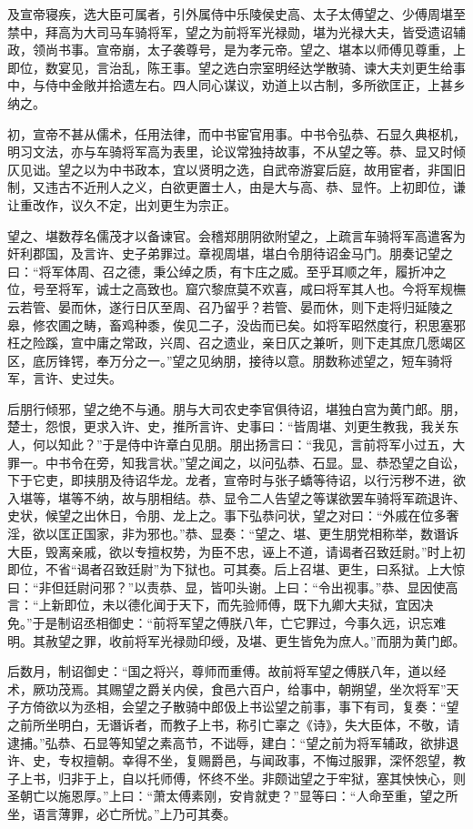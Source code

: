 \documentclass[]{article}
\begin{document}
及宣帝寝疾，选大臣可属者，引外属侍中乐陵侯史高、太子太傅望之、少傅周堪至禁中，拜高为大司马车骑将军，望之为前将军光禄勋，堪为光禄大夫，皆受遗诏辅政，领尚书事。宣帝崩，太子袭尊号，是为孝元帝。望之、堪本以师傅见尊重，上即位，数宴见，言治乱，陈王事。望之选白宗室明经达学散骑、谏大夫刘更生给事中，与侍中金敞并拾遗左右。四人同心谋议，劝道上以古制，多所欲匡正，上甚乡纳之。

初，宣帝不甚从儒术，任用法律，而中书宦官用事。中书令弘恭、石显久典枢机，明习文法，亦与车骑将军高为表里，论议常独持故事，不从望之等。恭、显又时倾仄见诎。望之以为中书政本，宜以贤明之选，自武帝游宴后庭，故用宦者，非国旧制，又违古不近刑人之义，白欲更置士人，由是大与高、恭、显忤。上初即位，谦让重改作，议久不定，出刘更生为宗正。

望之、堪数荐名儒茂才以备谏官。会稽郑朋阴欲附望之，上疏言车骑将军高遣客为奸利郡国，及言许、史子弟罪过。章视周堪，堪白令朋待诏金马门。朋奏记望之曰：``将军体周、召之德，秉公绰之质，有卞庄之威。至乎耳顺之年，履折冲之位，号至将军，诚士之高致也。窟穴黎庶莫不欢喜，咸曰将军其人也。今将军规橅云若管、晏而休，遂行日仄至周、召乃留乎？若管、晏而休，则下走将归延陵之皋，修农圃之畴，畜鸡种黍，俟见二子，没齿而已矣。如将军昭然度行，积思塞邪枉之险蹊，宣中庸之常政，兴周、召之遗业，亲日仄之兼听，则下走其庶几愿竭区区，底厉锋锷，奉万分之一。''望之见纳朋，接待以意。朋数称述望之，短车骑将军，言许、史过失。

后朋行倾邪，望之绝不与通。朋与大司农史李官俱待诏，堪独白宫为黄门郎。朋，楚士，怨恨，更求入许、史，推所言许、史事曰：``皆周堪、刘更生教我，我关东人，何以知此？''于是侍中许章白见朋。朋出扬言曰：``我见，言前将军小过五，大罪一。中书令在旁，知我言状。''望之闻之，以问弘恭、石显。显、恭恐望之自讼，下于它吏，即挟朋及待诏华龙。龙者，宣帝时与张子蟜等待诏，以行污秽不进，欲入堪等，堪等不纳，故与朋相结。恭、显令二人告望之等谋欲罢车骑将军疏退许、史状，候望之出休日，令朋、龙上之。事下弘恭问状，望之对曰：``外戚在位多奢淫，欲以匡正国家，非为邪也。''恭、显奏：``望之、堪、更生朋党相称举，数谮诉大臣，毁离亲戚，欲以专擅权势，为臣不忠，诬上不道，请谒者召致廷尉。''时上初即位，不省``谒者召致廷尉''为下狱也。可其奏。后上召堪、更生，曰系狱。上大惊曰：``非但廷尉问邪？''以责恭、显，皆叩头谢。上曰：``令出视事。''恭、显因使高言：``上新即位，未以德化闻于天下，而先验师傅，既下九卿大夫狱，宜因决免。''于是制诏丞相御史：``前将军望之傅朕八年，亡它罪过，今事久远，识忘难明。其赦望之罪，收前将军光禄勋印绶，及堪、更生皆免为庶人。''而朋为黄门郎。

后数月，制诏御史：``国之将兴，尊师而重傅。故前将军望之傅朕八年，道以经术，厥功茂焉。其赐望之爵关内侯，食邑六百户，给事中，朝朔望，坐次将军''天子方倚欲以为丞相，会望之子散骑中郎伋上书讼望之前事，事下有司，复奏：``望之前所坐明白，无谮诉者，而教子上书，称引亡辜之《诗》，失大臣体，不敬，请逮捕。''弘恭、石显等知望之素高节，不诎辱，建白：``望之前为将军辅政，欲排退许、史，专权擅朝。幸得不坐，复赐爵邑，与闻政事，不悔过服罪，深怀怨望，教子上书，归非于上，自以托师傅，怀终不坐。非颇诎望之于牢狱，塞其怏怏心，则圣朝亡以施恩厚。''上曰：``萧太傅素刚，安肯就吏？''显等曰：``人命至重，望之所坐，语言薄罪，必亡所忧。''上乃可其奏。
\end{document}
